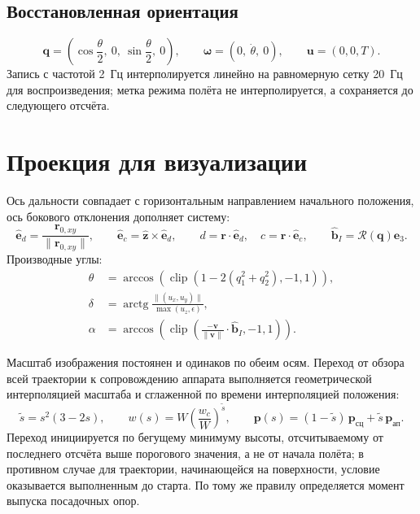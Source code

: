 \documentclass[11pt,a4paper]{article}
\newcommand{\vect}[1]{\bm{#1}}
\newcommand{\quat}[1]{\bm{#1}}
\newcommand{\Rot}{\mathcal{R}}
\newcommand{\eh}{\hat{\vect{e}}_d}
\newcommand{\ec}{\hat{\vect{e}}_c}
\begin{document}
\subsection{Восстановленная ориентация}

\begin{equation}
\quat{q} = \left(\cos\frac{\theta}{2},\ 0,\
 \sin\frac{\theta}{2},\ 0\right),
\qquad
\boldsymbol{\omega} = \left(0,\ \dot\theta,\ 0\right),
\qquad
\vect{u}=(0,0,T).
\end{equation}
Запись с частотой 2~Гц интерполируется линейно на равномерную сетку 20~Гц для
воспроизведения; метка режима полёта не интерполируется, а сохраняется до
следующего отсчёта.

\section{Проекция для визуализации}

Ось дальности совпадает с горизонтальным направлением начального положения, ось
бокового отклонения дополняет систему:
\begin{equation}
\eh = \frac{\vect{r}_{0,xy}}{\lVert\vect{r}_{0,xy}\rVert},
\qquad
\ec = \hat{\vect{z}}\times\eh,
\qquad
d=\vect{r}\cdot\eh,\quad c=\vect{r}\cdot\ec,
\qquad
\hat{\vect{b}}_I = \Rot(\quat{q})\vect{e}_3 .
\end{equation}
Производные углы:
\begin{align}
\theta &= \arccos\left(\operatorname{clip}
 \left(1-2\left(q_1^2+q_2^2\right),-1,1\right)\right), \\
\delta &= \operatorname{arctg}
 \frac{\lVert(u_x,u_y)\rVert}{\max(u_z,\epsilon)}, \\
\alpha &= \arccos\!\left(\operatorname{clip}\!\left(
  \frac{-\vect{v}}{\lVert\vect{v}\rVert}\cdot\hat{\vect{b}}_I,-1,1\right)\right).
\end{align}

Масштаб изображения постоянен и одинаков по обеим осям. Переход от обзора всей
траектории к сопровождению аппарата выполняется геометрической интерполяцией
масштаба и сглаженной по времени интерполяцией положения:
\begin{equation}
\tilde s = s^2(3-2s),
\qquad
w(s) = W\left(\frac{w_c}{W}\right)^{\tilde s},
\qquad
\vect{p}(s) = (1-\tilde s)\,\vect{p}_{\text{сц}}
 + \tilde s\,\vect{p}_{\text{ап}} .
\end{equation}
Переход инициируется по бегущему минимуму высоты, отсчитываемому от последнего
отсчёта выше порогового значения, а не от начала полёта; в противном случае для
траектории, начинающейся на поверхности, условие оказывается выполненным до
старта. По тому же правилу определяется момент выпуска посадочных опор.
\end{document}
